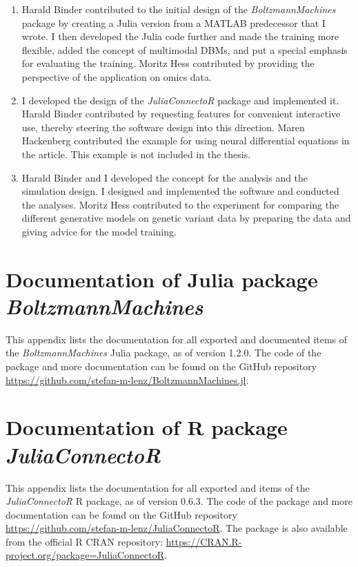 \documentclass[12pt]{article}
\newcommand{\apkg}[1]{\emph{#1}}
\begin{document}
\begin{appendices}
\begin{enumerate}[(1)]
\item
Harald Binder contributed to the initial design of the \apkg{BoltzmannMachines} package by creating a Julia version from a MATLAB predecessor that I wrote.
I then developed the Julia code further and made the training more flexible, added the concept of multimodal DBMs, and put a special emphasis for evaluating the training.
Moritz Hess contributed by providing the perspective of the application on omics data.

\item
I developed the design of the \apkg{JuliaConnectoR} package and implemented it.
Harald Binder contributed by requesting features for convenient interactive use, thereby steering the software design into this direction.
Maren Hackenberg contributed the example for using neural differential equations in the article. 
This example is not included in the thesis.

\item
Harald Binder and I developed the concept for the analysis and the simulation design. I designed and implemented the software and conducted the analyses. Moritz Hess contributed to  the experiment for comparing the different generative models on genetic variant data by preparing the data and giving advice for the model training.
\end{enumerate}




\setlength{\emergencystretch}{3em}

\clearpage
\section[Documentation of Julia package \apkg{BoltzmannMachines}]{Documentation of Julia package \\ \apkg{BoltzmannMachines}}
\label{BMDoku}

This appendix lists the documentation for all exported and documented items of the \apkg{BoltzmannMachines} Julia package, as of version 1.2.0. The code of the package and more documentation can be found on the GitHub repository \url{https://github.com/stefan-m-lenz/BoltzmannMachines.jl}.



\clearpage
\section[Documentation of R package \apkg{JuliaConnectoR}]{Documentation of R package \\ \apkg{JuliaConnectoR}}
\label{JuliaConnectoRDoku}
This appendix lists the documentation for all exported and items of the \apkg{JuliaConnectoR} R package, as of version 0.6.3. The code of the package and more documentation can be found on the GitHub repository \url{https://github.com/stefan-m-lenz/JuliaConnectoR}. The package is also available from the official R CRAN repository: \url{https://CRAN.R-project.org/package=JuliaConnectoR}.


\end{appendices}
\end{document}
